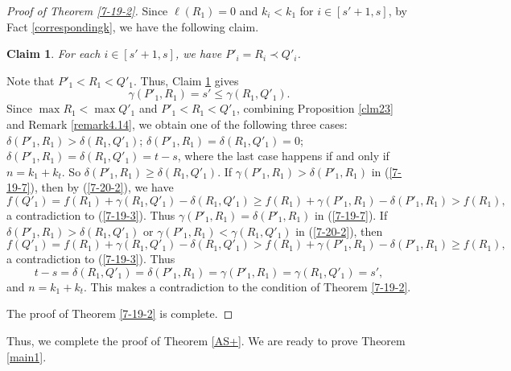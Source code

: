 \documentclass[a4paper,11pt]{article}
\newtheorem{claim}[theorem]{Claim}
\begin{document}
\begin{proof}[Proof of Theorem \ref{7-19-2}]
Since  $\ell(R_1)=0$ and $k_i<k_1$ for $i\in [s'+1, s]$,  by Fact \ref{correspondingk}, we have the following claim. 
\begin{claim}\label{7-19-8}
For each $i\in [s'+1, s]$, we have $P'_i=R_i\prec Q'_i$.
\end{claim}

Note that $P'_1<R_1<Q'_1$.
Thus, Claim \ref{7-19-8} gives
\begin{equation}\label{7-20-2}
\gamma(P'_1, R_1)=s'\leq \gamma(R_1, Q'_1).
\end{equation}
Since $\max R_1<\max Q'_1$ and $P'_1<R_1<Q'_1$, combining Proposition \ref{clm23} and Remark \ref{remark4.14}, we obtain one of the following three cases:
$\delta(P'_1, R_1)>\delta(R_1, Q'_1)$;  $\delta(P'_1, R_1)=\delta(R_1, Q'_1)=0$;
 $\delta(P'_1, R_1)=\delta(R_1, Q'_1)=t-s$, where the last case happens if and only if $n=k_1+k_t$.
So $\delta(P'_1, R_1)\geq \delta(R_1, Q'_1)$.
If $\gamma(P'_1, R_1)> \delta(P'_1, R_1)$ in (\ref{7-19-7}), then by (\ref{7-20-2}), we have
$$f(Q'_1)=f(R_1)+\gamma(R_1, Q'_1)-\delta(R_1, Q'_1)\geq f(R_1)+\gamma(P'_1, R_1)-\delta(P'_1, R_1)>f(R_1),$$
a contradiction to (\ref{7-19-3}).
Thus $\gamma(P'_1, R_1)= \delta(P'_1, R_1)$ in (\ref{7-19-7}).
If $\delta(P'_1, R_1)> \delta(R_1, Q'_1)$ or $\gamma(P'_1, R_1)< \gamma(R_1, Q'_1)$ in (\ref{7-20-2}),
then
$$f(Q'_1)=f(R_1)+\gamma(R_1, Q'_1)-\delta(R_1, Q'_1)> f(R_1)+\gamma(P'_1, R_1)-\delta(P'_1, R_1)\geq f(R_1),$$
a contradiction to (\ref{7-19-3}). Thus
$$t-s=\delta(R_1, Q'_1)=\delta(P'_1, R_1)=\gamma(P'_1, R_1)= \gamma(R_1, Q'_1)=s',$$
and $n=k_1+k_t$.
This makes a contradiction to the condition of Theorem \ref{7-19-2}.

The proof of Theorem \ref{7-19-2} is complete.
\end{proof}

Thus, we complete the proof of Theorem \ref{AS+}.
We are ready to prove Theorem \ref{main1}.
\end{document}
